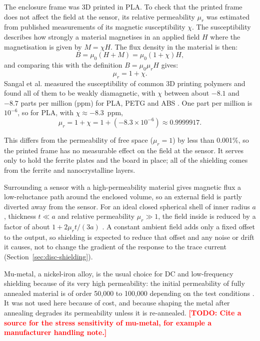 \documentclass[12pt,a4paper]{article}
\newcommand{\todo}[1]{\textcolor{red}{\textbf{[TODO: #1]}}}
\begin{document}
The enclosure frame was 3D printed in PLA. To check that the printed frame does not affect the field at the sensor, its relative permeability $\mu_r$ was estimated from published measurements of its magnetic susceptibility $\chi$. The susceptibility describes how strongly a material magnetises in an applied field $H$ where the magnetisation is given by $M = \chi H$. The flux density in the material is then:
\begin{equation}
B = \mu_0 (H + M) = \mu_0 (1 + \chi) H,
\label{eq:susceptibility}
\end{equation}
and comparing this with the definition $B = \mu_0 \mu_r H$ gives:
\begin{equation}
\mu_r = 1 + \chi .
\label{eq:mur-chi}
\end{equation}
Sangal et al. measured the susceptibility of common 3D printing polymers and found all of them to be weakly diamagnetic, with $\chi$ between about $-8.1$ and $-8.7$ parts per million (ppm) for PLA, PETG and ABS \cite{sangal2023}. One part per million is $10^{-6}$, so for PLA, with $\chi \approx -8.3$~ppm,
\begin{equation}
\mu_r = 1 + \chi = 1 + \left(-8.3 \times 10^{-6}\right) \approx 0.9999917 .
\label{eq:mur-pla}
\end{equation}

This differs from the permeability of free space ($\mu_r = 1$) by less than 0.001\%, so the printed frame has no measurable effect on the field at the sensor. It serves only to hold the ferrite plates and the board in place; all of the shielding comes from the ferrite and nanocrystalline layers.

 Surrounding a sensor with a high-permeability material gives magnetic flux a low-reluctance path around the enclosed volume, so an external field is partly diverted away from the sensor. For an ideal closed spherical shell of inner radius $a$, thickness $t \ll a$ and relative permeability $\mu_r \gg 1$, the field inside is reduced by a factor of about $1 + 2\mu_r t/(3a)$ \cite{fitzpatrick_shielding}. A constant ambient field adds only a fixed offset to the output, so shielding is expected to reduce that offset and any noise or drift it causes, not to change the gradient of the response to the trace current (Section~\ref{sec:disc-shielding}).

Mu-metal, a nickel-iron alloy, is the usual choice for DC and low-frequency shielding because of its very high permeability: the initial permeability of fully annealed material is of order 50{,}000 to 100{,}000 depending on the test conditions \cite{msc_mumetal}. It was not used here because of cost, and because shaping the metal after annealing degrades its permeability unless it is re-annealed. \todo{Cite a source for the stress sensitivity of mu-metal, for example a manufacturer handling note.}
\end{document}
